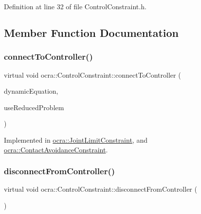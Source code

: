 Definition at line 32 of file Control\+Constraint.\+h.



\subsection{Member Function Documentation}
\hypertarget{classocra_1_1ControlConstraint_a04dabdc1c469146e7b3240dfe0a5172c}{}\label{classocra_1_1ControlConstraint_a04dabdc1c469146e7b3240dfe0a5172c} 
\subsubsection{\texorpdfstring{connect\+To\+Controller()}{connectToController()}}
{\footnotesize\ttfamily virtual void ocra\+::\+Control\+Constraint\+::connect\+To\+Controller (\begin{DoxyParamCaption}\item[{const \hyperlink{classocra_1_1FullDynamicEquationFunction}{Full\+Dynamic\+Equation\+Function} \&}]{dynamic\+Equation,  }\item[{bool}]{use\+Reduced\+Problem }\end{DoxyParamCaption})\hspace{0.3cm}{\ttfamily [pure virtual]}}



Implemented in \hyperlink{classocra_1_1JointLimitConstraint_a71cfd04e493f270e44b79fb5a46c1601}{ocra\+::\+Joint\+Limit\+Constraint}, and \hyperlink{classocra_1_1ContactAvoidanceConstraint_a9beada2720203ab46265f271309a2ab5}{ocra\+::\+Contact\+Avoidance\+Constraint}.

\hypertarget{classocra_1_1ControlConstraint_adbd15b36773c775a06a0b7bde46ec799}{}\label{classocra_1_1ControlConstraint_adbd15b36773c775a06a0b7bde46ec799} 
\subsubsection{\texorpdfstring{disconnect\+From\+Controller()}{disconnectFromController()}}
{\footnotesize\ttfamily virtual void ocra\+::\+Control\+Constraint\+::disconnect\+From\+Controller (\begin{DoxyParamCaption}{ }\end{DoxyParamCaption})\hspace{0.3cm}{\ttfamily [pure virtual]}}




